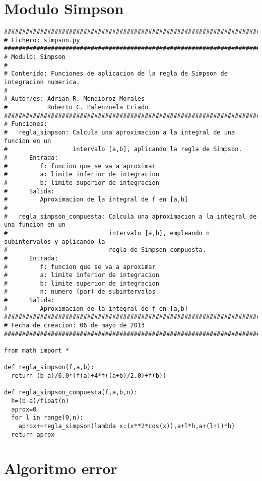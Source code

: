 \section{Modulo Simpson}
\label{Apendice1:Simpson}

\begin{center}
\begin{footnotesize}
\begin{verbatim}
##################################################################################
# Fichero: simpson.py
###################################################################################
# Modulo: Simpson 
#
# Contenido: Funciones de aplicacion de la regla de Simpson de integracion numerica. 
#
# Autor/es: Adrian R. Mendioroz Morales
#           Roberto C. Palenzuela Criado
###################################################################################
# Funciones:
#   regla_simpson: Calcula una aproximacion a la integral de una funcion en un 
#                  intervalo [a,b], aplicando la regla de Simpson.
#      Entrada:
#         f: funcion que se va a aproximar
#         a: limite inferior de integracion
#         b: limite superior de integracion
#      Salida:
#         Aproximacion de la integral de f en [a,b]
# 
#   regla_simpson_compuesta: Calcula una aproximacion a la integral de una funcion en un 
#                            intervalo [a,b], empleando n subintervalos y aplicando la 
#                            regla de Simpson compuesta.
#      Entrada:
#         f: funcion que se va a aproximar
#         a: limite inferior de integracion
#         b: limite superior de integracion
#         n: numero (par) de subintervalos
#      Salida:
#         Aproximacion de la integral de f en [a,b]
###################################################################################
# Fecha de creacion: 06 de mayo de 2013
###################################################################################

from math import *

def regla_simpson(f,a,b):
  return (b-a)/6.0*(f(a)+4*f((a+b)/2.0)+f(b))
  
def regla_simpson_compuesta(f,a,b,n):
  h=(b-a)/float(n)
  aprox=0
  for l in range(0,n):
    aprox+=regla_simpson(lambda x:(x**2*cos(x)),a+l*h,a+(l+1)*h)
  return aprox
\end{verbatim}
\end{footnotesize}
\end{center}

\section{Algoritmo error}
\label{Apendice1:error}

